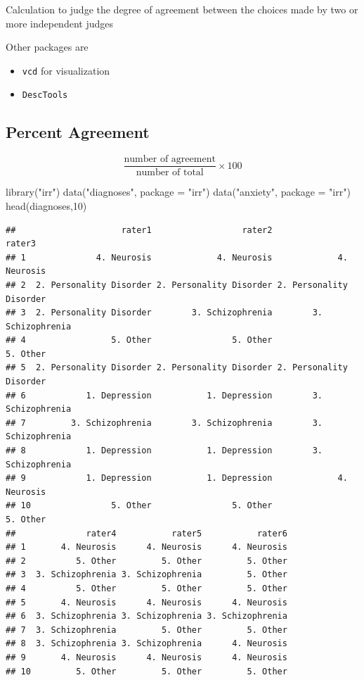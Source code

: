 \documentclass[
]{book}
\newenvironment{Shaded}{\begin{snugshade}}{\end{snugshade}}
\newcommand{\AttributeTok}[1]{\textcolor[rgb]{0.77,0.63,0.00}{#1}}
\newcommand{\DecValTok}[1]{\textcolor[rgb]{0.00,0.00,0.81}{#1}}
\newcommand{\FunctionTok}[1]{\textcolor[rgb]{0.00,0.00,0.00}{#1}}
\newcommand{\NormalTok}[1]{#1}
\newcommand{\StringTok}[1]{\textcolor[rgb]{0.31,0.60,0.02}{#1}}
\begin{document}
Calculation to judge the degree of agreement between the choices made by two or more independent judges

Other packages are

\begin{itemize}
\item
  \texttt{vcd} for visualization
\item
  \texttt{DescTools}
\end{itemize}

\hypertarget{percent-agreement}{%
\subsection{Percent Agreement}\label{percent-agreement}}

\[
\frac{\text{number of agreement}}{\text{number of total}} \times 100
\]

\begin{Shaded}
\begin{Highlighting}[]
\FunctionTok{library}\NormalTok{(}\StringTok{"irr"}\NormalTok{)}
\FunctionTok{data}\NormalTok{(}\StringTok{"diagnoses"}\NormalTok{, }\AttributeTok{package =} \StringTok{"irr"}\NormalTok{)}
\FunctionTok{data}\NormalTok{(}\StringTok{"anxiety"}\NormalTok{, }\AttributeTok{package =} \StringTok{"irr"}\NormalTok{)}
\FunctionTok{head}\NormalTok{(diagnoses,}\DecValTok{10}\NormalTok{)}
\end{Highlighting}
\end{Shaded}

\begin{verbatim}
##                     rater1                  rater2                  rater3
## 1              4. Neurosis             4. Neurosis             4. Neurosis
## 2  2. Personality Disorder 2. Personality Disorder 2. Personality Disorder
## 3  2. Personality Disorder        3. Schizophrenia        3. Schizophrenia
## 4                 5. Other                5. Other                5. Other
## 5  2. Personality Disorder 2. Personality Disorder 2. Personality Disorder
## 6            1. Depression           1. Depression        3. Schizophrenia
## 7         3. Schizophrenia        3. Schizophrenia        3. Schizophrenia
## 8            1. Depression           1. Depression        3. Schizophrenia
## 9            1. Depression           1. Depression             4. Neurosis
## 10                5. Other                5. Other                5. Other
##              rater4           rater5           rater6
## 1       4. Neurosis      4. Neurosis      4. Neurosis
## 2          5. Other         5. Other         5. Other
## 3  3. Schizophrenia 3. Schizophrenia         5. Other
## 4          5. Other         5. Other         5. Other
## 5       4. Neurosis      4. Neurosis      4. Neurosis
## 6  3. Schizophrenia 3. Schizophrenia 3. Schizophrenia
## 7  3. Schizophrenia         5. Other         5. Other
## 8  3. Schizophrenia 3. Schizophrenia      4. Neurosis
## 9       4. Neurosis      4. Neurosis      4. Neurosis
## 10         5. Other         5. Other         5. Other
\end{verbatim}
\end{document}

